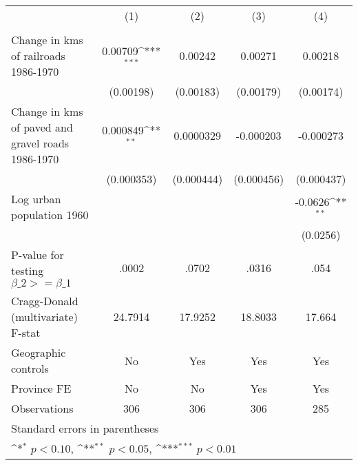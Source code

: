 {
\def\sym#1{\ifmmode^{#1}\else\(^{#1}\)\fi}
\begin{tabular}{l*{4}{c}}
\hline\hline
                &\multicolumn{1}{c}{(1)}&\multicolumn{1}{c}{(2)}&\multicolumn{1}{c}{(3)}&\multicolumn{1}{c}{(4)}\\
                &\multicolumn{1}{c}{}&\multicolumn{1}{c}{}&\multicolumn{1}{c}{}&\multicolumn{1}{c}{}\\
\hline
Change in kms of railroads 1986-1970&  0.00709\sym{***}&  0.00242         &  0.00271         &  0.00218         \\
                &(0.00198)         &(0.00183)         &(0.00179)         &(0.00174)         \\
[1em]
Change in kms of paved and gravel roads 1986-1970& 0.000849\sym{**} &0.0000329         &-0.000203         &-0.000273         \\
                &(0.000353)         &(0.000444)         &(0.000456)         &(0.000437)         \\
[1em]
Log urban population 1960&                  &                  &                  &  -0.0626\sym{**} \\
                &                  &                  &                  & (0.0256)         \\
\hline
P-value for testing $\beta\_{2} >= \beta\_{1}$&    .0002         &    .0702         &    .0316         &     .054         \\
Cragg-Donald (multivariate) F-stat&  24.7914         &  17.9252         &  18.8033         &   17.664         \\
Geographic controls&       No         &      Yes         &      Yes         &      Yes         \\
Province FE     &       No         &       No         &      Yes         &      Yes         \\
Observations    &      306         &      306         &      306         &      285         \\
\hline\hline
\multicolumn{5}{l}{\footnotesize Standard errors in parentheses}\\
\multicolumn{5}{l}{\footnotesize \sym{*} \(p<0.10\), \sym{**} \(p<0.05\), \sym{***} \(p<0.01\)}\\
\end{tabular}
}
